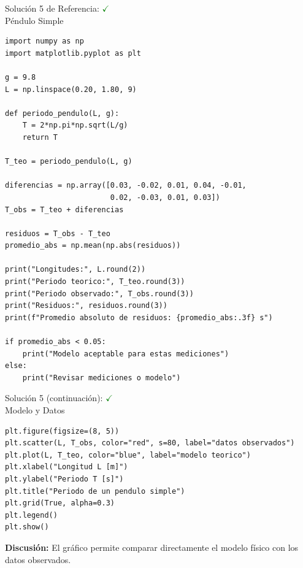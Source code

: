 \documentclass[10pt]{beamer}
\begin{document}
\begin{solutionblock}
\begin{frame}[fragile]{Solución 5 de Referencia: \hfill \textcolor{green}{$\checkmark$} \\ Péndulo Simple}
\begin{Verbatim}[fontsize=\tiny]
import numpy as np
import matplotlib.pyplot as plt

g = 9.8
L = np.linspace(0.20, 1.80, 9)

def periodo_pendulo(L, g):
    T = 2*np.pi*np.sqrt(L/g)
    return T

T_teo = periodo_pendulo(L, g)

diferencias = np.array([0.03, -0.02, 0.01, 0.04, -0.01,
                        0.02, -0.03, 0.01, 0.03])
T_obs = T_teo + diferencias

residuos = T_obs - T_teo
promedio_abs = np.mean(np.abs(residuos))

print("Longitudes:", L.round(2))
print("Periodo teorico:", T_teo.round(3))
print("Periodo observado:", T_obs.round(3))
print("Residuos:", residuos.round(3))
print(f"Promedio absoluto de residuos: {promedio_abs:.3f} s")

if promedio_abs < 0.05:
    print("Modelo aceptable para estas mediciones")
else:
    print("Revisar mediciones o modelo")
\end{Verbatim}
\end{frame}
\end{solutionblock}

\begin{solutionblock}
\begin{frame}[fragile]{Solución 5 (continuación): \hfill \textcolor{green}{$\checkmark$} \\ Modelo y Datos}
\begin{Verbatim}[fontsize=\tiny]
plt.figure(figsize=(8, 5))
plt.scatter(L, T_obs, color="red", s=80, label="datos observados")
plt.plot(L, T_teo, color="blue", label="modelo teorico")
plt.xlabel("Longitud L [m]")
plt.ylabel("Periodo T [s]")
plt.title("Periodo de un pendulo simple")
plt.grid(True, alpha=0.3)
plt.legend()
plt.show()
\end{Verbatim}
\textbf{Discusión:} El gráfico permite comparar directamente el modelo físico con los datos observados.
\end{frame}
\end{solutionblock}
\end{document}
